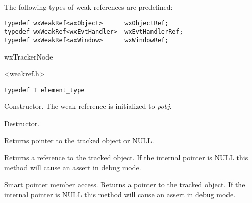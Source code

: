 
The following types of weak references are predefined: 

\begin{verbatim}
typedef wxWeakRef<wxObject>      wxObjectRef;
typedef wxWeakRef<wxEvtHandler>  wxEvtHandlerRef;
typedef wxWeakRef<wxWindow>      wxWindowRef;
\end{verbatim}



wxTrackerNode


<weakref.h>


{\small%
\begin{verbatim}
typedef T element_type
\end{verbatim}
}%




\label{wxweakrefwxweakref}


Constructor. The weak reference is initialized to {\it pobj}.


\label{wxweakrefdtor}


Destructor.


\label{wxweakrefget}


Returns pointer to the tracked object or NULL.


\label{wxweakrefoperatorreft}


Returns a reference to the tracked object. If the internal pointer is NULL
this method will cause an assert in debug mode.


\label{wxweakrefoperatorderef}


Smart pointer member access. Returns a pointer to the
tracked object. If the internal pointer is NULL this
method will cause an assert in debug mode.


\label{wxweakrefoperatorassign}

